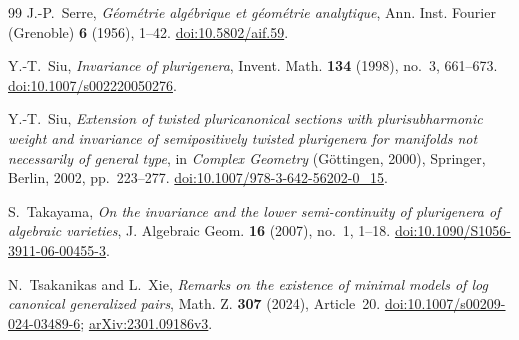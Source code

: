 \documentclass[11pt,a4paper]{article}
\numberwithin{equation}{section}
\theoremstyle{definition}
\theoremstyle{remark}
\begin{document}
\begin{thebibliography}{99}
J.-P.~Serre,
\emph{Géométrie algébrique et géométrie analytique},
Ann. Inst. Fourier (Grenoble) \textbf{6} (1956), 1--42.
\href{https://doi.org/10.5802/aif.59}{doi:10.5802/aif.59}.

Y.-T.~Siu,
\emph{Invariance of plurigenera},
Invent. Math. \textbf{134} (1998), no.~3, 661--673.
\href{https://doi.org/10.1007/s002220050276}{doi:10.1007/s002220050276}.

Y.-T.~Siu,
\emph{Extension of twisted pluricanonical sections with plurisubharmonic
weight and invariance of semipositively twisted plurigenera for manifolds
not necessarily of general type},
in \emph{Complex Geometry} (Göttingen, 2000),
Springer, Berlin, 2002, pp.~223--277.
\href{https://doi.org/10.1007/978-3-642-56202-0_15}{doi:10.1007/978-3-642-56202-0\_15}.

S.~Takayama,
\emph{On the invariance and the lower semi-continuity of plurigenera
of algebraic varieties},
J. Algebraic Geom. \textbf{16} (2007), no.~1, 1--18.
\href{https://doi.org/10.1090/S1056-3911-06-00455-3}{doi:10.1090/S1056-3911-06-00455-3}.

N.~Tsakanikas and L.~Xie,
\emph{Remarks on the existence of minimal models of log canonical
generalized pairs},
Math. Z. \textbf{307} (2024), Article~20.
\href{https://doi.org/10.1007/s00209-024-03489-6}{doi:10.1007/s00209-024-03489-6};
\href{https://arxiv.org/abs/2301.09186v3}{arXiv:2301.09186v3}.

\end{thebibliography}
\end{document}
